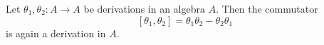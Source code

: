Let $\theta_1, \theta_2: A \to A$ be derivations in an algebra $A$. Then the commutator
$$
[\theta_1, \theta_2] = \theta_1 \theta_2 - \theta_2 \theta_1
$$
is again a derivation in $A$.

